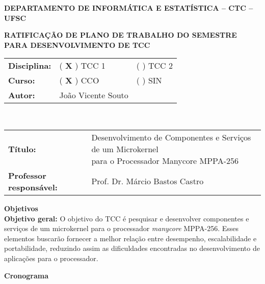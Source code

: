 \documentclass[12pt]{article}
\begin{document}
\pagestyle{empty}

\begin{centering}

	\textbf{DEPARTAMENTO DE INFORMÁTICA E ESTATÍSTICA -- CTC -- UFSC}

	\textbf{RATIFICAÇÃO DE PLANO DE TRABALHO DO SEMESTRE \\ PARA DESENVOLVIMENTO DE TCC}

\end{centering}


\vspace{1em}
\setlength\extrarowheight{5pt}
\begin{tabular}{l l l}
	\textbf{Disciplina:} & ( \textbf{X} ) TCC 1 &  ( \textbf{} ) TCC 2\\
	\textbf{Curso:}      & ( \textbf{X} ) CCO   & ( ) SIN             \\
	\textbf{Autor:}      & João Vicente Souto   &                     \\
\end{tabular}
\vspace{0.5cm}
\\
\begin{tabular}{l l}
\vspace{0.2cm}
	\textbf{Título:} & \makecell{Desenvolvimento de Componentes e Serviços de um Microkernel
	                                    \\para o Processador Manycore MPPA-256}\\
	\textbf{Professor responsável:} & Prof. Dr. Márcio Bastos Castro\\
\end{tabular}

\vspace{2em}
{\large \textbf{Objetivos}}
\\

\textbf{Objetivo geral:}
O objetivo do TCC é pesquisar e desenvolver componentes e serviços de um
microkernel para o processador \textit{manycore} MPPA-256. Esses elementos
buscarão fornecer a melhor relação entre desempenho, escalabilidade e 
portabilidade, reduzindo assim as dificuldades encontradas no desenvolvimento
de aplicações para o processador.

\vspace{2em}
{\large \textbf{Cronograma}}
\\

\end{document}
